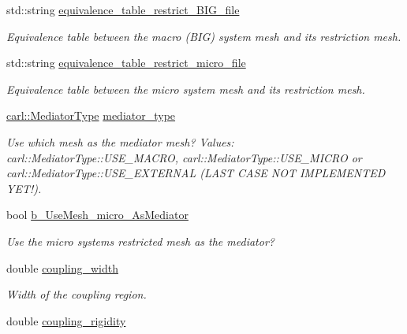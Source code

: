 \begin{DoxyCompactItemize}
std\+::string \hyperlink{structcarl_1_1coupling__assemble__coupling__input__params_a38e203a052eb26245cc22e80084464dd}{equivalence\+\_\+table\+\_\+restrict\+\_\+\+B\+I\+G\+\_\+file}
\begin{DoxyCompactList}\small\item\em Equivalence table between the macro (B\+I\+G) system mesh and its restriction mesh. \end{DoxyCompactList}\item 
std\+::string \hyperlink{structcarl_1_1coupling__assemble__coupling__input__params_a07948e27f6a1a82cffbd1780f28350c7}{equivalence\+\_\+table\+\_\+restrict\+\_\+micro\+\_\+file}
\begin{DoxyCompactList}\small\item\em Equivalence table between the micro system mesh and its restriction mesh. \end{DoxyCompactList}\item 
\hyperlink{namespacecarl_ab4549821791d976a4bb9a3460fe1718e}{carl\+::\+Mediator\+Type} \hyperlink{structcarl_1_1coupling__assemble__coupling__input__params_aa520455b2876272ffc924f060f2a332a}{mediator\+\_\+type}
\begin{DoxyCompactList}\small\item\em Use which mesh as the mediator mesh? {\itshape Values}\+: carl\+::\+Mediator\+Type\+::\+U\+S\+E\+\_\+\+M\+A\+C\+R\+O, carl\+::\+Mediator\+Type\+::\+U\+S\+E\+\_\+\+M\+I\+C\+R\+O or carl\+::\+Mediator\+Type\+::\+U\+S\+E\+\_\+\+E\+X\+T\+E\+R\+N\+A\+L (L\+A\+S\+T C\+A\+S\+E N\+O\+T I\+M\+P\+L\+E\+M\+E\+N\+T\+E\+D Y\+E\+T!). \end{DoxyCompactList}\item 
bool \hyperlink{structcarl_1_1coupling__assemble__coupling__input__params_adefe0489c1e39fb6bb1965a3e80d2bf5}{b\+\_\+\+Use\+Mesh\+\_\+micro\+\_\+\+As\+Mediator}
\begin{DoxyCompactList}\small\item\em Use the micro system\textquotesingle{}s restricted mesh as the mediator? \end{DoxyCompactList}\item 
double \hyperlink{structcarl_1_1coupling__assemble__coupling__input__params_a2cfb03a4663c3c6bc494a88084000249}{coupling\+\_\+width}
\begin{DoxyCompactList}\small\item\em Width of the coupling region. \end{DoxyCompactList}\item 
double \hyperlink{structcarl_1_1coupling__assemble__coupling__input__params_a9f0e82658b0e37c16faed3bc3a176dc1}{coupling\+\_\+rigidity}

\end{DoxyCompactItemize}
